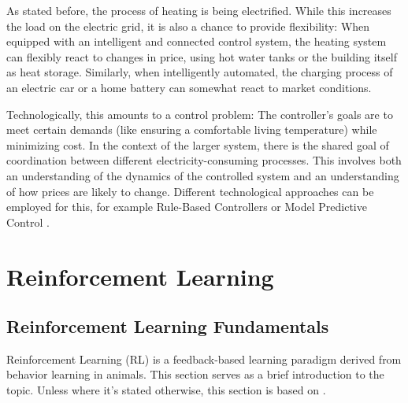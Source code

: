 As stated before, the process of heating is being electrified.
While this increases the load on the electric grid, it is also a chance to provide flexibility:
When equipped with an intelligent and connected control system, the heating system can flexibly react to changes in price, using hot water tanks or the building itself as heat storage.
Similarly, when intelligently automated, the charging process of an electric car or a home battery can somewhat react to market conditions.

Technologically, this amounts to a control problem:
The controller's goals are to meet certain demands (like ensuring a comfortable living temperature) while minimizing cost. In the context of the larger system, there is the shared goal of coordination between different electricity-consuming processes.
This involves both an understanding of the dynamics of the controlled system and an understanding of how prices are likely to change.
Different technological approaches can be employed for this, for example Rule-Based Controllers or Model Predictive Control \citep{li2021EnergyFlexibilityResidential}.

\section{Reinforcement Learning}



\subsection{Reinforcement Learning Fundamentals}
Reinforcement Learning (RL) is a feedback-based learning paradigm derived from behavior learning in animals.
This section serves as a brief introduction to the topic.
Unless where it's stated otherwise, this section is based on \cite{sutton2018ReinforcementLearningIntroduction}.

